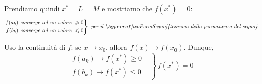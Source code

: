 \documentclass[../../dimostrazioni]{subfiles}
\begin{document}
            Prendiamo quindi \(x^* = L = M\) e mostriamo che \(f(x^*) = 0\):
            \[
                \left.
                \begin{aligned}
                    f(a_k) \text{\emph{ converge ad un valore }} \geqslant 0\\
                    f(b_k) \text{\emph{ converge ad un valore }} \leqslant 0
                \end{aligned}
                \right\}
                \text{\emph{ per il \hyperref[teoPermSegno]{teorema della permanenza del segno}}}
            \]

            Uso la continuità di \(f\): se \(x \to x_0\), allora \(f(x) \to f(x_0)\). Dunque,
            \[
                \left.
                \begin{aligned}
                    f(a_k) \to f(x^*) \geqslant 0&\\
                    f(b_k) \to f(x^*) \leqslant 0&
                \end{aligned}
                \right\} \, f(x^*) = 0
            \]
        
\end{document}
